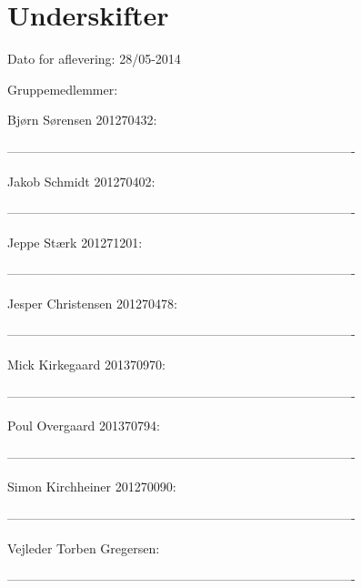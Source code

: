 \chapter{Underskifter}

Dato for aflevering: 28/05-2014

Gruppemedlemmer:

Bjørn Sørensen 201270432:


----------------------------------------------------------------------------------

Jakob Schmidt 201270402:


----------------------------------------------------------------------------------

Jeppe Stærk 201271201:


----------------------------------------------------------------------------------

Jesper Christensen 201270478:


----------------------------------------------------------------------------------

Mick Kirkegaard 201370970:


----------------------------------------------------------------------------------

Poul Overgaard 201370794:


----------------------------------------------------------------------------------

Simon Kirchheiner 201270090:


----------------------------------------------------------------------------------







Vejleder Torben Gregersen:


----------------------------------------------------------------------------------